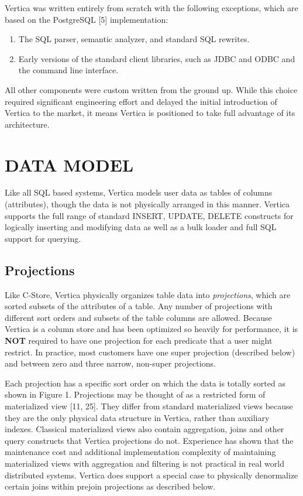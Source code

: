 \documentclass[a4paper,12pt,notitlepage,twoside,openright]{article}
\begin{document}
Vertica was written entirely from scratch with the following exceptions,
which are based on the PostgreSQL {[}5{]} implementation:

\begin{enumerate}
\def\labelenumi{\arabic{enumi}.}
\item
  The SQL parser, semantic analyzer, and standard SQL rewrites.
\item
  Early versions of the standard client libraries, such as JDBC and ODBC
  and the command line interface.
\end{enumerate}

All other components were custom written from the ground up. While this
choice required significant engineering effort and delayed the initial
introduction of Vertica to the market, it means Vertica is positioned to
take full advantage of its architecture.

\hypertarget{data-model}{%
\section{DATA MODEL}\label{data-model}}

Like all SQL based systems, Vertica models user data as tables of
columns (attributes), though the data is not physically arranged in this
manner. Vertica supports the full range of standard INSERT, UPDATE,
DELETE constructs for logically inserting and modifying data as well as
a bulk loader and full SQL support for querying.

\hypertarget{projections}{%
\subsection{Projections}\label{projections}}

Like C-Store, Vertica physically organizes table data into
\emph{projections}, which are sorted subsets of the attributes of a
table. Any number of projections with different sort orders and subsets
of the table columns are allowed. Because Vertica is a column store and
has been optimized so heavily for performance, it is \textbf{NOT}
required to have one projection for each predicate that a user might
restrict. In practice, most customers have one super projection
(described below) and between zero and three narrow, non-super
projections.

Each projection has a specific sort order on which the data is totally
sorted as shown in Figure 1. Projections may be thought of as a
restricted form of materialized view {[}11, 25{]}. They differ from
standard materialized views because they are the only physical data
structure in Vertica, rather than auxiliary indexes. Classical
materialized views also contain aggregation, joins and other query
constructs that Vertica projections do not. Experience has shown that
the maintenance cost and additional implementation complexity of
maintaining materialized views with aggregation and filtering is not
practical in real world distributed systems. Vertica does support a
special case to physically denormalize certain joins within prejoin
projections as described below.
\end{document}
